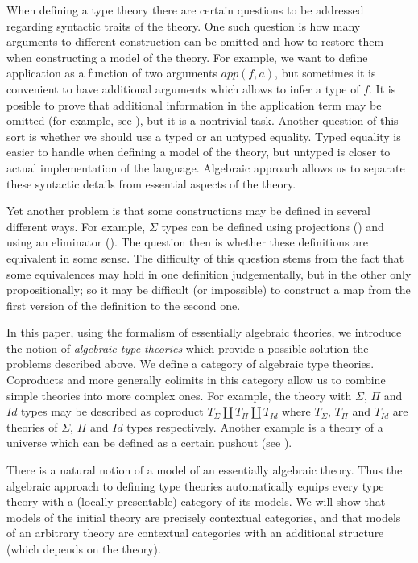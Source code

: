 \documentclass[reqno]{amsart}
\theoremstyle{definition}
\theoremstyle{remark}
\numberwithin{figure}{section}
\begin{document}
When defining a type theory there are certain questions to be addressed regarding syntactic traits of the theory.
One such question is how many arguments to different construction can be omitted and how to restore them when constructing a model of the theory.
For example, we want to define application as a function of two arguments $app(f,a)$, but sometimes it is convenient to have additional arguments which allows to infer a type of $f$.
It is posible to prove that additional information in the application term may be omitted (for example, see \cite{streicher}), but it is a nontrivial task.
Another question of this sort is whether we should use a typed or an untyped equality.
Typed equality is easier to handle when defining a model of the theory, but untyped is closer to actual implementation of the language.
Algebraic approach allows us to separate these syntactic details from essential aspects of the theory.

Yet another problem is that some constructions may be defined in several different ways.
For example, $\Sigma$ types can be defined using projections () and using an eliminator ().
The question then is whether these definitions are equivalent in some sense.
The difficulty of this question stems from the fact that some equivalences may hold in one definition judgementally, but in the other only propositionally;
so it may be difficult (or impossible) to construct a map from the first version of the definition to the second one.

In this paper, using the formalism of essentially algebraic theories, we introduce the notion of
\emph{algebraic type theories} which provide a possible solution the problems described above.
We define a category of algebraic type theories.
Coproducts and more generally colimits in this category allow us to combine simple theories into more complex ones.
For example, the theory with $\Sigma$, $\Pi$ and $Id$ types may be described as coproduct $T_\Sigma \amalg T_\Pi \amalg T_{Id}$
where $T_\Sigma$, $T_\Pi$ and $T_{Id}$ are theories of $\Sigma$, $\Pi$ and $Id$ types respectively.
Another example is a theory of a universe which can be defined as a certain pushout (see ).

There is a natural notion of a model of an essentially algebraic theory.
Thus the algebraic approach to defining type theories automatically equips every type theory with a (locally presentable) category of its models.
We will show that models of the initial theory are precisely contextual categories,
and that models of an arbitrary theory are contextual categories with an additional structure (which depends on the theory).
\end{document}
